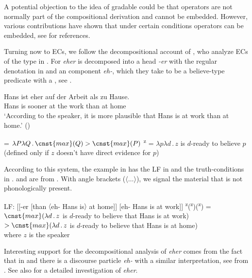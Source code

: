 \documentclass[output=paper,colorlinks,citecolor=brown,newtxmath]{langsci/langscibook}
\begin{document}
\noindent A potential objection to the idea of gradable  could be that   operators are not normally part of the compositional derivation and cannot be  embedded. However, various contributions have shown that under certain conditions  operators can be embedded, see \citet{grewol17} for references.

Turning now to ECs, we follow the decompositional account of \citet{herrub14}, who analyze  ECs of the type in . For \citet{herrub14} \textit{eher} is decomposed into a  head \textit{-er} with the regular denotation in  and an  component \textit{eh-}, which they take to be a believe-type predicate with a , see .


	\ea \gll Hans ist eher auf der Arbeit als zu Hause.\\
 	Hans is sooner at the work than at home\\
  	\glt `According to the speaker, it is more plausible that Hans is at work than at home.'  \hfill ()  \label{ger1}
    \z

 	\ea  \label{hr} \ea {} = $\lambda P\lambda Q\,.\,\cnst{max}(Q) > \cnst{max}(P)$ \label{sxer}
   	\ex {}\textsuperscript{z} = $\lambda p\lambda d\,.\,z$ is $d$-ready to believe $p$ \\
       (defined only if $z$ doesn't have direct evidence for $p$) \label{sxeh}
        \z \z

\noindent According to this system, the example in  has the LF in  and the truth-conditions in .  and  are from \cite[564--565]{herrub14}. With angle brackets ($\langle{\ldots}\rangle$), we signal the material that is not phonologically present.

	\ea \label{eher} \ea LF: [[-er [than $\langle$eh- Hans is$\rangle$ at home]] [eh- Hans is at work]] \label{ehera}
 	\ex {}\textsuperscript{z}(\textsuperscript{z})(\textsuperscript{z}) = \\
    $ \cnst{max}(\lambda d\,.\,z$ is $d$-ready to believe that Hans is at work) $ > \cnst{max}(\lambda d\,.\,z$ is $d$-ready to believe that Hans is at home) \\
    where $z$ is  the speaker \label{eherb}
	\z \z

\noindent Interesting support for the decompositional analysis of \textit{eher} comes from the fact that in  and  there is a discourse particle \textit{eh-} with a similar  interpretation, see  from \cite[ex.32]{herrub14}. See also \citet{zob17} for a detailed investigation of \textit{eher}.
\end{document}
